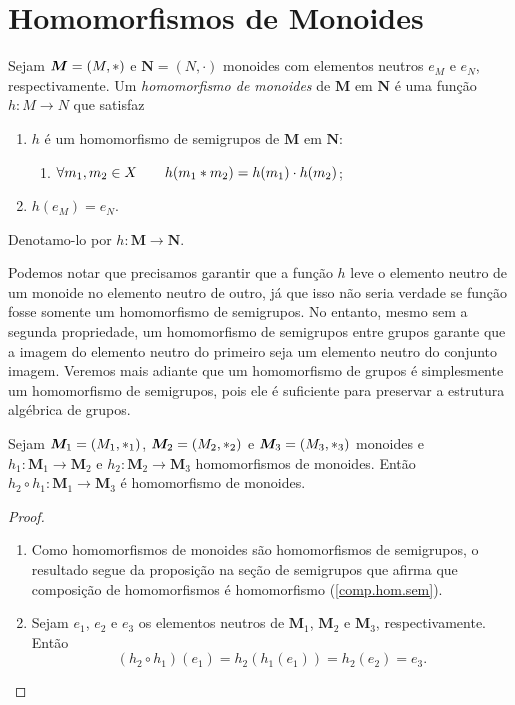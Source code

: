\section{Homomorfismos de Monoides}

\begin{defi}
	Sejam $\bm M=(M, \ast )$ e $\bm N=(N,\cdot)$ monoides com elementos neutros $e_M$ e $e_N$, respectivamente. Um \emph{homomorfismo de monoides} de $\bm M$ em $\bm N$ é uma função $h: M \to N$ que satisfaz
	\begin{enumerate}
	\item $h$ é um homomorfismo de semigrupos de $\bm M$ em $\bm N$:
		\begin{enumerate}
		\item $\forall m_1,m_2 \in X \qquad h(m_1  \ast  m_2)=h(m_1) \cdot h(m_2)$;
		\end{enumerate}
	\item $h(e_M)=e_N$.
	\end{enumerate}
\noindent Denotamo-lo por $h: \bm M \to \bm N$. %
\end{defi}

	Podemos notar que precisamos garantir que a função $h$ leve o elemento neutro de um monoide no elemento neutro de outro, já que isso não seria verdade se função fosse somente um homomorfismo de semigrupos. No entanto, mesmo sem a segunda propriedade, um homomorfismo de semigrupos entre grupos garante que a imagem do elemento neutro do primeiro seja um elemento neutro do conjunto imagem. Veremos mais adiante que um homomorfismo de grupos é simplesmente um homomorfismo de semigrupos, pois ele é suficiente para preservar a estrutura algébrica de grupos.

\begin{prop}
\label{comp.hom.mon}
	Sejam $\bm M_1=(M_1, \ast _1)$, $\bm M_2=(M_2, \ast _2)$ e $\bm M_3=(M_3, \ast _3)$ monoides e $h_1: \bm M_1 \to \bm M_2$ e $h_2: \bm M_2 \to \bm M_3$ homomorfismos de monoides. Então $h_2 \circ h_1: \bm M_1 \to \bm M_3$ é homomorfismo de monoides.
\end{prop}
\begin{proof}
	\begin{enumerate}
	\item Como homomorfismos de monoides são homomorfismos de semigrupos, o resultado segue da proposição na seção de semigrupos que afirma que composição de homomorfismos é homomorfismo (\ref{comp.hom.sem}).
	\item Sejam $e_1$, $e_2$ e $e_3$ os elementos neutros de $\bm M_1$, $\bm M_2$ e $\bm M_3$, respectivamente. Então
	\begin{equation*}
	(h_2 \circ h_1)(e_1) = h_2(h_1(e_1)) = h_2(e_2) = e_3.
	\end{equation*}
	\end{enumerate}
\end{proof}



